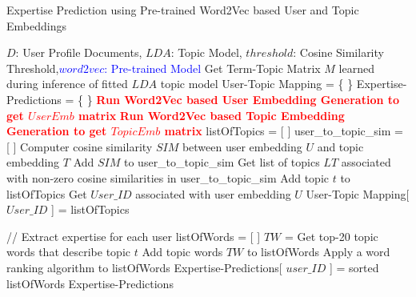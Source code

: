             \begin{algorithm}
            \caption{Expertise Prediction using Pre-trained Word2Vec based User and Topic Embeddings}
            \label{alg:word2vec_emb}
            \begin{algorithmic}[1]
               \REQUIRE $D$: User Profile Documents, $LDA$: Topic Model, $threshold$: Cosine Similarity Threshold,\textcolor{blue}{$word2vec$: Pre-trained Model}
                \STATE Get Term-Topic Matrix $M$ learned during inference of fitted $LDA$ topic model
                \STATE User-Topic Mapping = \{ \}
                \STATE Expertise-Predictions = \{ \}
                \STATE \textbf{\textcolor{red}{Run Word2Vec based User Embedding Generation to get $UserEmb$ matrix}}
                \STATE \textbf{\textcolor{red}{Run Word2Vec based Topic Embedding Generation to get $TopicEmb$ matrix}}
                \STATE
                    \STATE listOfTopics = [ ]
                    \STATE user\_to\_topic\_sim = [ ]
                        \STATE Computer cosine similarity $SIM$ between user embedding $U$ and topic embedding $T$
                        \STATE Add $SIM$ to user\_to\_topic\_sim
                    \ENDFOR
                    \STATE
                    \STATE Get list of topics $LT$ associated with non-zero cosine similarities in user\_to\_topic\_sim
                            \STATE Add topic $t$ to listOfTopics
                        \ENDIF
                    \ENDFOR
                    \STATE Get $User\_ID$ associated with user embedding $U$
                    \STATE User-Topic Mapping[ $User\_ID$ ] = listOfTopics
                    
                    \STATE
                    \STATE // Extract expertise for each user
                    \STATE listOfWords = [ ]
                        \STATE $TW$ = Get top-20 topic words that describe topic $t$
                        \STATE Add topic words $TW$ to listOfWords
                    \ENDFOR
                    \STATE Apply a word ranking algorithm to listOfWords
                    \STATE Expertise-Predictions[ $user\_ID$ ] = sorted listOfWords
                \ENDFOR
                \RETURN Expertise-Predictions
            \end{algorithmic}
            \end{algorithm}
            
